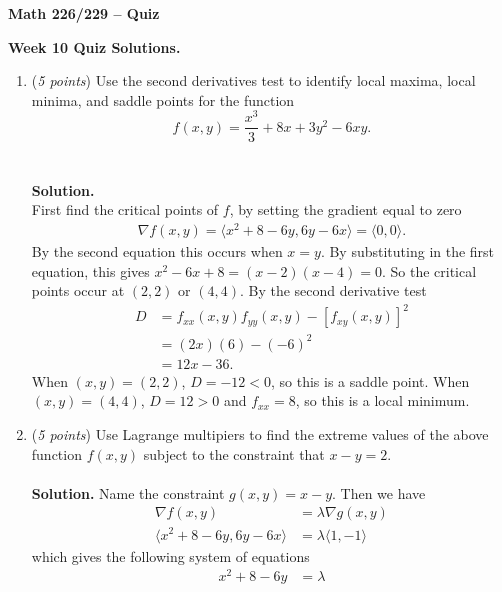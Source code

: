 \documentclass[12 pt]{article}
\begin{document}
	\begin{center}
		\textbf{\hfill Math 226/229 -- Quiz} \\
	\end{center}
	\medskip

	\noindent
	\textbf{Week 10 Quiz Solutions.} \hfill
	\vspace{.1in}
	\hspace*{0.2in}
	\medskip
	\noindent
  \begin{enumerate}
		\item (\textit{5 points})
		Use the second derivatives test to identify local maxima, local minima, and
		saddle points for the function \[
			f(x, y) = \frac{x^3}{3} + 8x + 3y^2 - 6xy.
		\]
    \\~\\
    \textbf{Solution.}
    \\
		First find the critical points of $f$, by setting the gradient equal to zero
		\begin{align*}
				\nabla f(x,y) = \langle x^2 + 8 - 6y, 6y - 6x \rangle = \langle 0, 0 \rangle.
		\end{align*}
		By the second equation this occurs when $x = y$. By substituting in the
		first equation, this gives $x^2 - 6x + 8 = (x-2)(x-4) = 0$. So the critical
		points occur at $(2, 2)$ or  $(4, 4)$.
		By the second derivative test \begin{align*}
			D &= f_{xx}(x, y)f_{yy}(x, y) - [f_{xy}(x, y)]^2 \\
				&= (2x)(6) - (-6)^2 \\
				&= 12x - 36.
		\end{align*}
		When $(x,y) = (2, 2)$, $D = -12 < 0$, so this is a saddle point. When
		$(x, y) = (4, 4)$, $D = 12 > 0$ and $f_{xx} = 8$, so this is a local
		minimum.
		\item (\textit{5 points})
		Use Lagrange multipiers to find the extreme values of the above function $f(x, y)$
		subject to the constraint that $x - y = 2$.
		\\~\\
    \textbf{Solution.}
		Name the constraint $g(x, y) = x - y$. Then we have \begin{align*}
			\nabla f(x, y) &= \lambda \nabla g(x, y) \\
			\langle x^2 + 8 - 6y, 6y - 6x \rangle &= \lambda\langle 1, -1 \rangle
		\end{align*} which gives the following system of equations \begin{align}
			x^2 + 8 - 6y &= \lambda \\

\end{align}
\end{enumerate}
\end{document}
